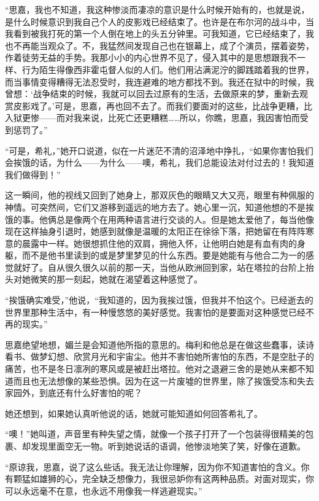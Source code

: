 \par “思嘉，我也不知道，我这种惨淡而凄凉的意识是什么时候开始有的，也就是说，是什么时候意识到我自己个人的皮影戏已经结束了。也许是在布尔河的战斗中，当我看到被我打死的第一个人倒在地上的头五分钟里。可我知道，它已经结束了，我也不再能当观众了。不，我猛然间发现自己也在银幕上，成了个演员，摆着姿势，作着徒劳无益的手势。我那小小的内心世界不见了，侵入其中的是思想跟我不一样、行为陌生得像西非霍屯督人似的人们。他们用沾满泥泞的脚践踏着我的世界，而当事情变得糟得无法忍受时，我连避难的地方都找不到。我还在狱中的时候，我曾想：‘战争结束的时候，我就可以回去过原有的生活，去做原来的梦，重新去观赏皮影戏了。’可是，思嘉，再也回不去了。而我们要面对的这些，比战争更糟，比入狱更惨——而对我来说，比死亡还更糟糕……所以，你瞧，思嘉，我因害怕而受到惩罚了。”
\par “可是，希礼，”她开口说道，似在一片迷茫不清的沼泽地中挣扎，“如果你害怕我们会挨饿的话，为什么——为什么——噢，希礼，我们总能设法对付过去的！我知道我们做得到！”
\par 这一瞬间，他的视线又回到了她身上，那双灰色的眼睛又大又亮，眼里有种佩服的神情。可突然间，它们又游移到遥远的地方去了。她心里一沉，知道他想的不是挨饿的事。他俩总是像两个在用两种语言进行交谈的人。但是她太爱他了，每当他像现在这样抽身引退时，她感到就像是温暖的太阳正在徐徐下落，把她留在有阵阵寒意的晨露中一样。她很想抓住他的双肩，拥他入怀，让他明白她是有血有肉的身躯，而不是他书里读到的或是梦里梦见的什么东西。要是她能有与他合二为一的感觉就好了。自从很久很久以前的那一天，当他从欧洲回到家，站在塔拉的台阶上抬头对她微笑的那一刻起，她就在渴望着这种感觉了。
\par “挨饿确实难受，”他说，“我知道的，因为我挨过饿，但我并不怕这个。已经逝去的世界里那种生活中，有一种慢悠悠的美好感觉。我害怕的是要面对这种感觉已经不再的现实。”
\par 思嘉绝望地想，媚兰是会知道他所指的意思的。梅利和他总是在做这些蠢事，读诗看书、做梦幻想、欣赏月光和宇宙尘。他并不害怕她所害怕的东西，不是空肚子的痛苦，也不是冬日凛冽的寒风或是被赶出塔拉。他对之退避三舍的是她从来都不知道而且也无法想像的某些恐惧。因为在这一片废墟的世界里，除了挨饿受冻和失去家园外，到底还有什么好害怕的呢？
\par 她还想到，如果她认真听他说的话，她就可能知道如何回答希礼了。
\par “噢！”她叫道，声音里有种失望之情，就像一个孩子打开了一个包装得很精美的包裹、却发现里面空无一物。听到她说话的语调，他惨淡地笑了笑，好像在道歉。
\par “原谅我，思嘉，说了这么些话。我无法让你理解，因为你不知道害怕的含义。你有颗猛如雄狮的心，完全缺乏想像力，我很忌妒你有这两种品质。对面对现实，你可以永远毫不在意，也永远不用像我一样逃避现实。”
